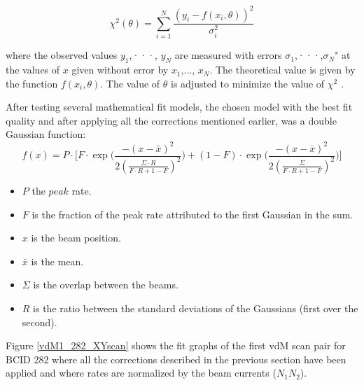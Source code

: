 \begin{equation}
\chi^{2}(\theta)=\sum_{i=1}^{N} \frac{(y_{i}-f(x_{i},\theta))^{2}}{\sigma_{i}^{2}}
\label{x^2}
\end{equation}

where the observed values $y_{1}$,···, $y_{N}$ are measured with errors $\sigma_{1}$,···,$\sigma_{N}$" at the values of $x$ given without error by $x_{1}$,..., $x_{N}$. The theoretical  value is given by the function $f(x_{i},\theta)$. The value of $\theta$ is adjusted to minimize the value of $\chi^2$ \cite{Statistical_Data_Analysis}.

After testing several mathematical fit models, the chosen model with the best fit quality and after applying all the corrections mentioned earlier, was a double Gaussian function:
\begin{equation}
f(x)= P \cdot \Biggl[ F \cdot \exp \Biggl( \frac{-(x-\bar{x})^{2}}{2(\frac{\Sigma\cdot R}{F \cdot R+1-F} )^{2} } \Biggr) + (1-F) \cdot \exp \Biggl( \frac{-(x-\bar{x})^{2}}{2 (\frac{\Sigma}{F \cdot R+1-F} )^{2} } \Biggr) \Biggr] 
\end{equation}
\begin{itemize}
\item $P$ the $peak$ rate.
\item $F$ is the fraction of the peak rate attributed to the first Gaussian in the sum.
\item $x$ is the beam position.
\item $\bar{x}$ is the mean.
\item $\Sigma$ is the overlap between the beams.
\item $R$ is the ratio between the standard deviations of the  Gaussians (first over the second).
\end{itemize}

Figure \ref{vdM1_282_XYscan} shows the fit graphs of the first vdM scan pair for BCID 282 where  all the corrections described in the previous section have been applied and where  rates are normalized by the beam currents ($N_{1}N_{2}$).

